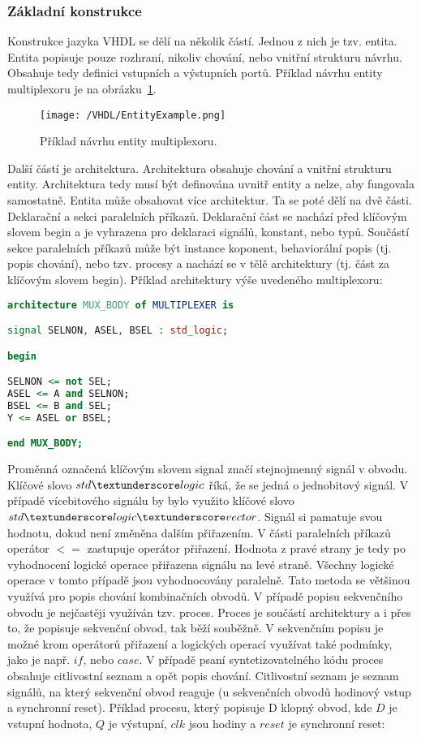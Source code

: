 \documentclass{report}
\begin{document}
\subsubsection{Základní konstrukce}
Konstrukce jazyka VHDL se dělí na několik částí. Jednou z nich je tzv. entita. Entita popisuje pouze rozhraní, nikoliv chování, nebo vnitřní strukturu návrhu. Obsahuje tedy definici vstupních a výstupních portů. Příklad návrhu entity multiplexoru je na obrázku~\ref{fig:entityexample}.
\begin{figure}
\centering
\texttt{[image: /VHDL/EntityExample.png]}
\caption{Příklad návrhu entity multiplexoru.}
\label{fig:entityexample}
\end{figure}
Další částí je architektura. Architektura obsahuje chování a vnitřní strukturu entity. Architektura tedy musí být definována uvnitř entity a nelze, aby fungovala samostatně. Entita může obsahovat více architektur. Ta se poté dělí na dvě části. Deklarační a sekci paralelních příkazů. Deklarační část se nachází před klíčovým slovem begin a je vyhrazena pro deklaraci signálů, konstant, nebo typů. Součástí sekce paralelních příkazů může být instance koponent, behaviorální popis (tj. popis chování), nebo tzv. procesy a nachází se v tělě architektury (tj. část za klíčovým slovem begin). Příklad architektury výše uvedeného multiplexoru:
\begin{lstlisting}[language=VHDL]
architecture MUX_BODY of MULTIPLEXER is

signal SELNON, ASEL, BSEL : std_logic;

begin

SELNON <= not SEL;
ASEL <= A and SELNON;
BSEL <= B and SEL;
Y <= ASEL or BSEL;

end MUX_BODY;
\end{lstlisting}
Proměnná označená klíčovým slovem signal značí stejnojmenný signál v obvodu. Klíčové slovo $std\textunderscore logic$ říká, že se jedná o jednobitový signál. V případě vícebitového signálu by bylo využito klíčové slovo $std\textunderscore logic\textunderscore vector$. Signál si pamatuje svou hodnotu, dokud není změněna dalším přiřazením. V části paralelních příkazů operátor $<=$ zastupuje operátor přiřazení. Hodnota z pravé strany je tedy po vyhodnocení logické operace přiřazena signálu na levé straně. Všechny logické operace v tomto případě jsou vyhodnocovány paralelně. Tato metoda se většinou využívá pro popis chování kombinačních obvodů. V případě popisu sekvenčního obvodu je nejčastěji využíván tzv. proces. Proces je součástí architektury a i přes to, že popisuje sekvenční obvod, tak běží souběžně. V sekvenčním popisu je možné krom operátorů přiřazení a logických operací využívat také podmínky, jako je např. $if$, nebo $case$. V případě psaní syntetizovatelného kódu proces obsahuje citlivostní seznam a opět popis chování. Citlivostní seznam je seznam signálů, na který sekvenční obvod reaguje (u sekvenčních obvodů hodinový vstup a synchronní reset). Příklad procesu, který popisuje D klopný obvod, kde $D$ je vstupní hodnota, $Q$ je výstupní, $clk$ jsou hodiny a $reset$ je synchronní reset:
\end{document}
